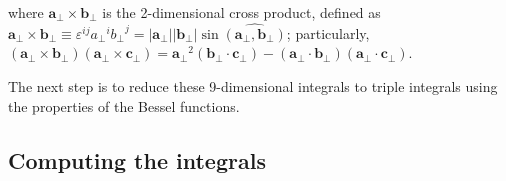 where $\mathbf{a}_\perp \times \mathbf{b}_\perp$ is the 2-dimensional cross product, defined as $\mathbf{a}_\perp \times \mathbf{b}_\perp \equiv \varepsilon^{ij} {a_\perp}^i {b_\perp}^j = |\mathbf{a}_\perp| |\mathbf{b}_\perp| \sin \hat{\left(\mathbf{a}_\perp,\mathbf{b}_\perp \right)} $; particularly, $\left( \mathbf{a}_\perp \times \mathbf{b}_\perp \right) \left( \mathbf{a}_\perp \times \mathbf{c}_\perp \right) = {\mathbf{a}_\perp}^2 \left(\mathbf{b}_\perp \cdot \mathbf{c}_\perp \right) - \left(\mathbf{a}_\perp \cdot \mathbf{b}_\perp \right) \left(\mathbf{a}_\perp \cdot \mathbf{c}_\perp \right)$.

The next step is to reduce these 9-dimensional integrals to triple integrals using the properties of the Bessel functions.

\subsection{Computing the integrals}


